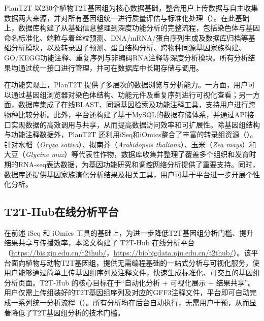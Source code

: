PlanT2T 以230个植物T2T基因组为核心数据基础，整合用户上传数据与自主收集数据两大来源，并对所有基因组统一进行质量评估与标准化处理（）。在此基础上，数据库构建了从基础信息整理到深度功能分析的完整流程，包括染色体与基因命名标准化、端粒与着丝粒预测、DNA/mRNA/蛋白序列生成及数据库归档等基础分析模块，以及转录因子预测、蛋白结构分析、跨物种同源基因家族构建、GO/KEGG功能注释、重复序列与非编码RNA注释等深度分析模块。所有分析结果均通过统一接口进行管理，并可在数据库中长期存储与调用。

在功能实现上，PlanT2T 提供了多层次的数据浏览与分析能力。一方面，用户可以通过基因组浏览器对染色体结构、功能元件及重复序列进行可视化查看；另一方面，数据库集成了在线BLAST、同源基因检索及功能注释工具，支持用户进行跨物种比较分析。此外，平台还构建了基于MySQL的数据存储体系，并通过API接口实现数据的高效调用与共享，从而提高数据访问效率和可扩展性。除基因组结构与功能注释数据外，PlanT2T 还利用iSeq和iOmics整合了丰富的转录组资源（）。针对水稻（\textit{Oryza sativa}）、拟南芥（\textit{Arabidopsis thaliana}）、玉米（\textit{Zea mays}）和大豆（\textit{Glycine max}）等代表性作物，数据库收集并整理了覆盖多个组织和发育时期的RNA-seq表达数据，为基因功能研究和调控网络分析提供了重要支持。同时，数据库还提供基因家族演化分析结果及相关工具，用户可基于平台进一步开展个性化分析。



\subsection{T2T-Hub在线分析平台}

在前述 iSeq 和 iOmics 工具的基础上，为进一步降低T2T基因组分析门槛、提升结果共享与传播效率，本论文构建了 T2T-Hub 在线分析平台（\url{https://bis.zju.edu.cn/t2thub/}，\url{https://biobigdata.nju.edu.cn/t2thub/}）。该平台面向植物与动物T2T基因组，提供无需编程基础的一站式分析与可视化服务，使用户能够通过简单上传基因组序列及注释文件，快速生成标准化、可交互的基因组分析页面。T2T-Hub 的核心目标在于“自动化分析 + 可视化展示 + 结果共享”。用户仅需上传组装好的T2T基因组序列及对应的GFF3注释文件，平台即可自动完成一系列统一分析流程（）。所有分析均在后台自动执行，无需用户干预，从而显著降低了T2T基因组分析的技术门槛。

